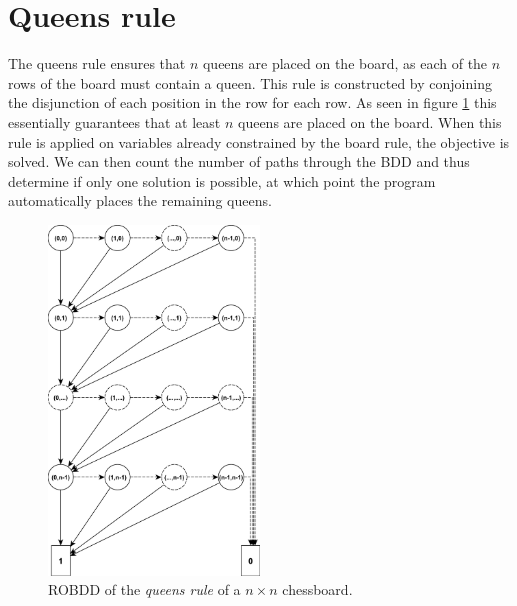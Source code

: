 \documentclass{report}
\begin{document}
	\section*{Queens rule} 
	\label{sub:queens_rule}
	The queens rule ensures that $n$ queens are placed on the board, as each of the $n$ rows of the board must contain a queen.
	This rule is constructed by conjoining the disjunction of each position in the row for each row.
	As seen in figure \ref{fig2} this essentially guarantees that at least $n$ queens are placed on the board.
	When this rule is applied on variables already constrained by the board rule, the objective is solved.
	We can then count the number of paths through the BDD and thus determine if only one solution is possible, at which point the program automatically places the remaining queens.

	\vspace{\fill}
	\begin{figure}[h]
		\begin{centering}
			\includegraphics[width=0.5\textwidth]{figures/queen-rule.pdf}
			\caption{ROBDD of the \emph{queens rule} of a $n \times n$ chessboard. }
		\end{centering}
		\label{fig2}
	\end{figure}
	\FloatBarrier
\end{document}
